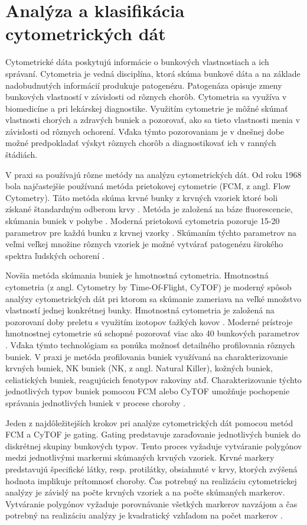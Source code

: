 \chapter{Analýza a klasifikácia cytometrických dát}
\label{DeepCyTOF_kap3}

Cytometrické dáta poskytujú informácie o bunkových vlastnostiach a ich správaní. Cytometria je vedná disciplína, ktorá skúma bunkové dáta a na základe nadobudnutých informácií produkuje patogenézu. Patogenáza opisuje zmeny bunkových vlastností v závislosti od rôznych chorôb. Cytometria sa využíva v biomedicíne a pri lekárskej diagnostike. Využitím cytometrie je môžné skúmať vlastnosti chorých a zdravých buniek a pozorovať, ako sa tieto vlastnosti menia v závislosti od rôznych ochorení. Vďaka týmto pozorovaniam je v dnešnej dobe možné predpokladať výskyt rôznych chorôb a diagnostikovať ich v ranných štádiách. 

V praxi sa používajú rôzne metódy na analýzu cytometrických dát. Od roku 1968 bola najčastejšie používaná metóda prietokovej cytometrie (FCM, z angl. Flow Cytometry). Táto metóda skúma krvné bunky z krvných vzoriek ktoré boli získané štandardným odberom krvy \cite{Li2016}. Metóda je založená na báze fluorescencie, skúmania buniek v pohybe \cite{Roubalova1934}. Moderná prietoková cytometria pozoruje 15-20 parametrov pre každú bunku z krvnej vzorky \cite{Roubalova1934}. Skúmaním týchto parametrov na veľmi veľkej množine rôznych vzoriek je možné vytvárať patogenézu širokého spektra ľudských ochorení \cite{Li2017}. 

Novšia metóda skúmania buniek je hmotnostná cytometria. Hmotnostná cytometria (z angl. Cytometry by Time-Of-Flight, CyTOF) je moderný spôsob analýzy cytometrických dát pri ktorom sa skúmanie zameriava na veľké množstvo vlastností jednej konkrétnej bunky. Hmotnostná cytometria je založená na pozorovaní doby preletu s využitím izotopov ťažkých kovov \cite{Roubalova1934}. Moderné prístroje hmotnostnej cytometrie sú schopné pozorovať viac ako 40 bunkových parametrov \cite{Roubalova1934, Li2017}. Vďaka týmto technológiam sa ponúka možnosť detailného profilovania rôznych buniek. V praxi je metóda profilovania buniek využívaná na charakterizovanie krvných buniek, NK buniek (NK, z angl. Natural Killer), kožných buniek, celiatických buniek, reagujúcich fenotypov rakoviny atď. Charakterizovanie týchto jednotlivých typov buniek pomocou FCM alebo CyTOF umožňuje pochopenie správania jednotlivých buniek v procese choroby \cite{Li2016}.

Jeden z najdôležitejších krokov pri analýze cytometrických dát pomocou metód FCM a CyTOF je gating. Gating predstavuje zaraďovanie jednotlivých buniek do diskrétnej skupiny bunkových typov. Tento proces vyžaduje vytváranie polygónov medzi jednotlivými markermi skúmaných krvných vzoriek. Krvné markery predstavujú špecifické látky, resp. protilátky, obsiahnuté v krvy, ktorých zvýšená hodnota implikuje prítomnosť choroby. Čas potrebný na realizáciu cytometrickej analýzy je závislý na počte krvných vzoriek a na počte skúmaných markerov. Vytváranie polygónov vyžaduje porovnávanie všetkých markerov navzájom a čas potrebný na realizáciu analýzy je kvadratický vzhľadom na počet markerov \cite{Li2016}. 

